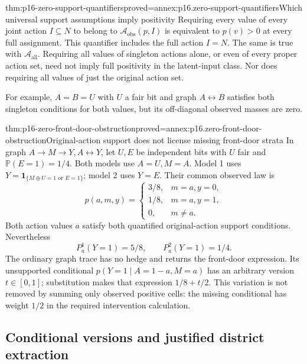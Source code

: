 \begin{hbtheorem}{thm:p16-zero-support-quantifiers}{proved=annex:p16.zero-support-quantifiers}{Which universal support assumptions imply positivity}
Requiring every value of every joint action \(I\subseteq N\)
to belong to \(\mathcal A_{\mathrm{obs}}(p,I)\) is equivalent
to \(p(v)>0\) at every full assignment. This quantifier includes
the full action \(I=N\). The same is true with
\(\mathcal A_{\mathrm{all}}\). Requiring all values of singleton
actions alone, or even of every proper action set, need not imply
full positivity in the latent-input class.
Nor does requiring all values of just the original action set.

For example, \(A=B=U\) with \(U\) a fair bit and graph
\(A\leftrightarrow B\) satisfies both singleton conditions
for both values, but its off-diagonal observed masses are zero.
\end{hbtheorem}

\begin{hbtheorem}{thm:p16-zero-front-door-obstruction}{proved=annex:p16.zero-front-door-obstruction}{Original-action support does not license missing front-door strata}
In graph \(A\to M\to Y,A\leftrightarrow Y\), let
\(U,E\) be independent bits with \(U\) fair and
\(\mathbb P(E=1)=1/4\). Both models use \(A=U,M=A\).
Model 1 uses \(Y=\mathbf1_{\{M\oplus U=1\text{ or }E=1\}}\);
model 2 uses \(Y=E\). Their common observed law is
\[
 p(a,m,y)=
 \begin{cases}
  3/8,&m=a, y=0,\\
  1/8,&m=a, y=1,\\
  0,&m\ne a.
 \end{cases}
\]
Both action values \(a\) satisfy both quantified original-action
support conditions. Nevertheless
\[
 P^1_a(Y=1)=5/8,\qquad P^2_a(Y=1)=1/4.
\]
The ordinary graph trace has no hedge and returns the front-door
expression. Its unsupported conditional \(p(Y=1\mid A=1-a,M=a)\)
has an arbitrary version \(t\in[0,1]\); substitution makes that
expression \(1/8+t/2\). This variation is not removed by summing
only observed positive cells: the missing conditional has weight \(1/2\)
in the required intervention calculation.
\end{hbtheorem}

\subsection{Conditional versions and justified district extraction}

